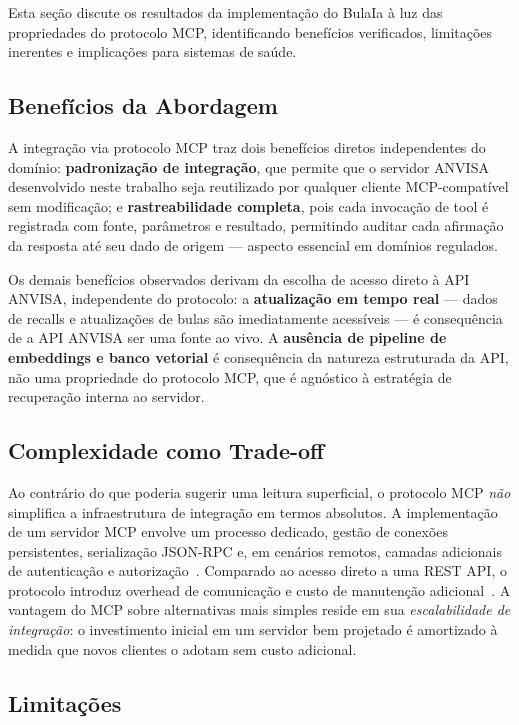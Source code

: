 \documentclass[12pt]{article}
\begin{document}
Esta seção discute os resultados da implementação do BulaIa à luz das propriedades do protocolo MCP, identificando benefícios verificados, limitações inerentes e implicações para sistemas de saúde.

\subsection{Benefícios da Abordagem}

A integração via protocolo MCP traz dois benefícios diretos independentes do domínio: \textbf{padronização de integração}, que permite que o servidor ANVISA desenvolvido neste trabalho seja reutilizado por qualquer cliente MCP-compatível sem modificação; e \textbf{rastreabilidade completa}, pois cada invocação de tool é registrada com fonte, parâmetros e resultado, permitindo auditar cada afirmação da resposta até seu dado de origem --- aspecto essencial em domínios regulados.

Os demais benefícios observados derivam da escolha de acesso direto à API ANVISA, independente do protocolo: a \textbf{atualização em tempo real} --- dados de recalls e atualizações de bulas são imediatamente acessíveis --- é consequência de a API ANVISA ser uma fonte ao vivo. A \textbf{ausência de pipeline de embeddings e banco vetorial} é consequência da natureza estruturada da API, não uma propriedade do protocolo MCP, que é agnóstico à estratégia de recuperação interna ao servidor.

\subsection{Complexidade como Trade-off}

Ao contrário do que poderia sugerir uma leitura superficial, o protocolo MCP \emph{não} simplifica a infraestrutura de integração em termos absolutos. A implementação de um servidor MCP envolve um processo dedicado, gestão de conexões persistentes, serialização JSON-RPC e, em cenários remotos, camadas adicionais de autenticação e autorização~\cite{xenoss2025mcp}. Comparado ao acesso direto a uma REST API, o protocolo introduz overhead de comunicação e custo de manutenção adicional~\cite{marktechpost2025mcp}. A vantagem do MCP sobre alternativas mais simples reside em sua \emph{escalabilidade de integração}: o investimento inicial em um servidor bem projetado é amortizado à medida que novos clientes o adotam sem custo adicional.

\subsection{Limitações}
\end{document}
